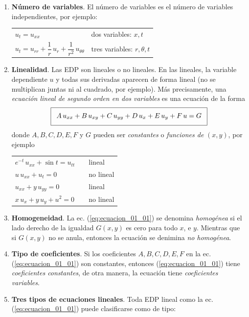 \begin{enumerate}
\item \textbf{Número de variables}. El número de variables es el número de variables independientes, por ejemplo:
\begin{table}[H]
\centering
\large
\begin{tabular}{l l}
\Large{$u_{t} = u_{xx}$} & dos variables: $x, t$ \\
\Large{$u_{t} = u_{rr} + \dfrac{1}{r} \, u_{r} + \dfrac{1}{r^{2}} \, u_{\theta \theta}$} & tres variables: $r, \theta, t$
\end{tabular}
\end{table}
\item \textbf{Linealidad}. Las EDP son lineales o no lineales. En las lineales, la variable dependiente $u$ y todas sus derivadas aparecen de forma lineal (no se multiplican juntas ni al cuadrado, por ejemplo). Más precisamente, una \emph{ecuación lineal de segundo orden en dos variables} es una ecuación de la forma
\begin{align}
\addtolength{\fboxsep}{5pt}\boxed{ A \, u_{xx} + B \, u_{xy} + C \, u_{yy} + D \, u_{x} + E \, u_{y} + F \, u = G}
\label{eq:ecuacion_01_01}
\end{align}
donde $A, B, C, D, E, F$ y $G$ pueden ser \emph{constantes} o \emph{funciones de} $(x, y)$, por ejemplo
\begin{table}[H]
\centering
\large
\begin{tabular}{l p{1cm} l}
\Large{$e^{-t} \, u_{xx} + \sin t = u_{tt}$} & & lineal \\
\Large{$u \, u_{xx} + u_{t} = 0$} & & no lineal \\
\Large{$u_{xx} + y \, u_{yy} = 0$} & & lineal \\
\Large{$x \, u_{x} + y \, u_{y} + u^{2} = 0$} & & no lineal
\end{tabular}
\end{table}
\item \textbf{Homogeneidad}. La ec. (\ref{eq:ecuacion_01_01}) se denomina \emph{homogénea} si el lado derecho de la igualdad $G(x, y)$ es cero para todo $x$, e $y$. Mientras que si $G(x, y)$ no se anula, entonces la ecuación se denimina \emph{no homogénea}.
\item \textbf{Tipo de coeficientes}. Si los coeficientes $A, B, C, D, E, F$ en la ec. (\ref{eq:ecuacion_01_01}) son constantes, entonces (\ref{eq:ecuacion_01_01}) tiene \emph{coeficientes constantes}, de otra manera, la ecuación tiene \emph{coeficientes variables}.
\item \textbf{Tres tipos de ecuaciones lineales}. Toda EDP lineal como la ec. (\ref{eq:ecuacion_01_01}) puede clasificarse como de tipo:

\end{enumerate}
